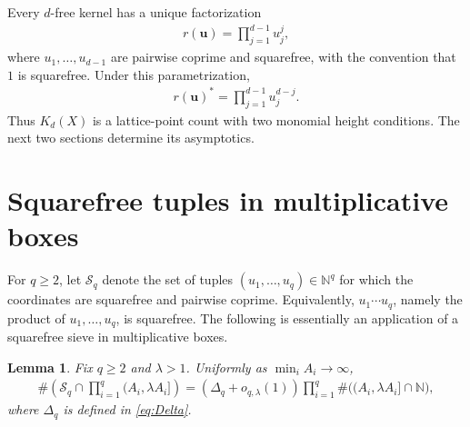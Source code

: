 \documentclass[10pt,a4paper]{amsart}
\numberwithin{equation}{section}
\newcommand{\N}{\mathbb N}
\newcommand{\1}{\mathbf 1}
\newcommand{\bsu}{\boldsymbol u}
\newtheorem{lemma}[theorem]{Lemma}
\begin{document}
Every $d$-free kernel has a unique factorization
\begin{align}
 r(\bsu)=\prod_{j=1}^{d-1}u_j^j,
\label{eq:factorization}
\end{align}
where $u_1,\ldots,u_{d-1}$ are pairwise coprime and squarefree, with
the convention that $1$ is squarefree.  Under this parametrization,
\begin{align}
 r(\bsu)^*=\prod_{j=1}^{d-1}u_j^{d-j}.
\label{eq:oppositefactorization}
\end{align}
Thus $K_d(X)$ is a lattice-point count with two monomial height
conditions.  The next two sections determine its asymptotics.

\section{Squarefree tuples in multiplicative boxes}

For $q\geq2$, let $\mathcal S_q$ denote the set of tuples
$(u_1,\ldots,u_q)\in\N^q$ for which the coordinates are squarefree and
pairwise coprime.  Equivalently, $u_1\cdots u_q$, namely the product of $u_1,\ldots,u_q$, is squarefree. The following is essentially an application of a squarefree sieve in multiplicative boxes. 

\begin{lemma}\label{lem:boxsieve}
Fix $q\geq2$ and $\lambda>1$.  Uniformly as
$\min_i A_i\to\infty$,
\begin{align*}
 \#\left(
 \mathcal S_q\cap\prod_{i=1}^q(A_i,\lambda A_i]
 \right)
 =\left(\Delta_q+o_{q,\lambda}(1)\right)
 \prod_{i=1}^q\#\bigl((A_i,\lambda A_i]\cap\N\bigr),
\end{align*}
where $\Delta_q$ is defined in \eqref{eq:Delta}.
\end{lemma}
\end{document}
